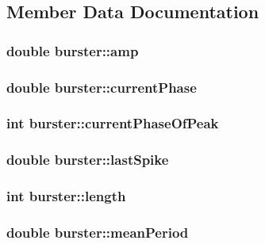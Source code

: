 \subsection{Member Data Documentation}
\hypertarget{classburster_aa638e8e2506c3d30f078c0b87154f998}{
\subsubsection[{amp}]{\setlength{\rightskip}{0pt plus 5cm}double burster\+::amp}}\label{classburster_aa638e8e2506c3d30f078c0b87154f998}
\hypertarget{classburster_a7fbf16a87a9f2db0e55b598ab141fcc5}{
\subsubsection[{current\+Phase}]{\setlength{\rightskip}{0pt plus 5cm}double burster\+::current\+Phase}}\label{classburster_a7fbf16a87a9f2db0e55b598ab141fcc5}
\hypertarget{classburster_acaa8e39d8618d0a0ab7baa624d49c9c9}{
\subsubsection[{current\+Phase\+Of\+Peak}]{\setlength{\rightskip}{0pt plus 5cm}int burster\+::current\+Phase\+Of\+Peak}}\label{classburster_acaa8e39d8618d0a0ab7baa624d49c9c9}
\hypertarget{classburster_ab60f56bc4aeacbfe091b5c4e2110e319}{
\subsubsection[{last\+Spike}]{\setlength{\rightskip}{0pt plus 5cm}double burster\+::last\+Spike}}\label{classburster_ab60f56bc4aeacbfe091b5c4e2110e319}
\hypertarget{classburster_a91e8471ba5fee99f889ad43ba17e88ee}{
\subsubsection[{length}]{\setlength{\rightskip}{0pt plus 5cm}int burster\+::length}}\label{classburster_a91e8471ba5fee99f889ad43ba17e88ee}
\hypertarget{classburster_ae0e933116108021580bc46b52bf26ae4}{
\subsubsection[{mean\+Period}]{\setlength{\rightskip}{0pt plus 5cm}double burster\+::mean\+Period}}\label{classburster_ae0e933116108021580bc46b52bf26ae4}
